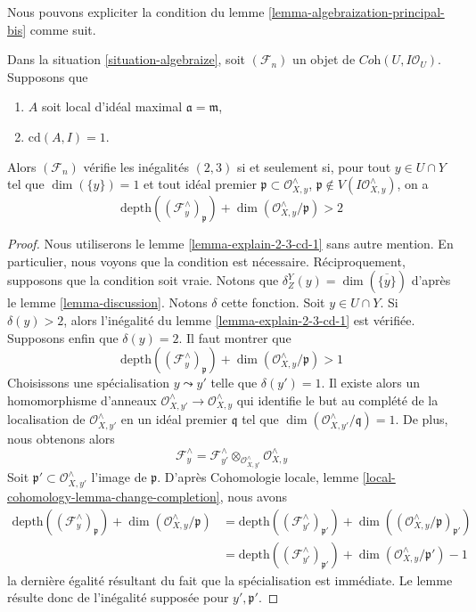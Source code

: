 \noindent
Nous pouvons expliciter la condition du
lemme \ref{lemma-algebraization-principal-bis} comme suit.

\begin{lemma}
\label{lemma-unwinding-conditions}
Dans la situation \ref{situation-algebraize}, soit $(\mathcal{F}_n)$ un objet
de $\textit{Coh}(U, I\mathcal{O}_U)$. Supposons que
\begin{enumerate}
\item $A$ soit local d'idéal maximal $\mathfrak a = \mathfrak m$,
\item $\text{cd}(A, I) = 1$.
\end{enumerate}
Alors $(\mathcal{F}_n)$ vérifie les inégalités $(2, 3)$ si et seulement
si, pour tout $y \in U \cap Y$ tel que $\dim(\{y\}) = 1$ et tout idéal premier
$\mathfrak p \subset \mathcal{O}_{X, y}^\wedge$,
$\mathfrak p \not \in V(I\mathcal{O}_{X, y}^\wedge)$, on a
$$
\text{depth}((\mathcal{F}_y^\wedge)_\mathfrak p) +
\dim(\mathcal{O}_{X, y}^\wedge/\mathfrak p) > 2
$$
\end{lemma}

\begin{proof}
Nous utiliserons le lemme \ref{lemma-explain-2-3-cd-1}
sans autre mention. En particulier, nous voyons que la condition est nécessaire.
Réciproquement, supposons que la condition soit vraie.
Notons que $\delta^Y_Z(y) = \dim(\overline{\{y\}})$ d'après le
lemme \ref{lemma-discussion}. Notons $\delta$ cette fonction.
Soit $y \in U \cap Y$. Si $\delta(y) > 2$, alors l'inégalité
du lemme \ref{lemma-explain-2-3-cd-1} est vérifiée.
Supposons enfin que $\delta(y) = 2$. Il faut montrer que
$$
\text{depth}((\mathcal{F}_y^\wedge)_\mathfrak p) +
\dim(\mathcal{O}_{X, y}^\wedge/\mathfrak p) > 1
$$
Choisissons une spécialisation $y \leadsto y'$ telle que $\delta(y') = 1$. Il existe alors
un homomorphisme d'anneaux $\mathcal{O}_{X, y'}^\wedge \to \mathcal{O}_{X, y}^\wedge$
qui identifie le but au complété de la localisation
de $\mathcal{O}_{X, y'}^\wedge$ en un idéal premier $\mathfrak q$
tel que $\dim(\mathcal{O}_{X, y'}^\wedge/\mathfrak q) = 1$.
De plus, nous obtenons alors
$$
\mathcal{F}_y^\wedge =
\mathcal{F}_{y'}^\wedge
\otimes_{\mathcal{O}_{X, y'}^\wedge}
\mathcal{O}_{X, y}^\wedge
$$
Soit $\mathfrak p' \subset \mathcal{O}_{X, y'}^\wedge$ l'image
de $\mathfrak p$.
D'après Cohomologie locale, lemme \ref{local-cohomology-lemma-change-completion},
nous avons
\begin{align*}
\text{depth}((\mathcal{F}_y^\wedge)_\mathfrak p) +
\dim(\mathcal{O}_{X, y}^\wedge/\mathfrak p)
& =
\text{depth}((\mathcal{F}_{y'}^\wedge)_{\mathfrak p'}) +
\dim((\mathcal{O}_{X, y}^\wedge/\mathfrak p)_{\mathfrak p'}) \\
& =
\text{depth}((\mathcal{F}_{y'}^\wedge)_{\mathfrak p'}) +
\dim(\mathcal{O}_{X, y}^\wedge/\mathfrak p') - 1
\end{align*}
la dernière égalité résultant du fait que la spécialisation est immédiate.
Le lemme résulte donc de l'inégalité supposée pour $y', \mathfrak p'$.
\end{proof}

